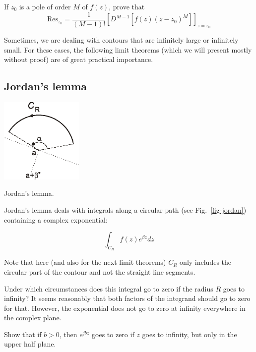 \begin{exer}
If $z_0$ is a pole of order $M$ of $f(z)$, prove that
$$\mathrm{Res}_{z_0} = \frac{1}{(M-1)!}{\left[D^{M-1}[f(z)(z-z_0)^M]\right]}_{z=z_0}$$
\end{exer}


\pagebreak


\label{week2}

Sometimes, we are dealing with contours that are infinitely large or infinitely small. For these cases, the following limit theorems (which we will present mostly without proof) are of great practical importance.

\subsection*{Jordan's lemma}

\begin{marginfigure}
\centering
\includegraphics[width=4cm]{complex/figures/jordan}
\caption{Jordan's lemma.}
\label{fig-jordan}
\end{marginfigure}

Jordan's lemma deals with integrals along a circular path  (see Fig.~\ref{fig-jordan}) containing a complex exponential: 

$$ \int_{{C}_R} f(z) e^{\beta z} dz$$

Note that here (and also for the next limit theorems) ${{C}_R}$ only includes the circular part of the contour and not the straight line segments.

Under which circumstances does this integral go to zero if the radius $R$ goes to infinity? It seems reasonably that both factors of the integrand should go to zero for that. However, the exponential does not go to zero at infinity everywhere in the complex plane. 

\begin{cue}
Show that if $b>0$, then $e^{jbz}$ goes to zero if $z$ goes to infinity, but only in the upper half plane.
\end{cue}

